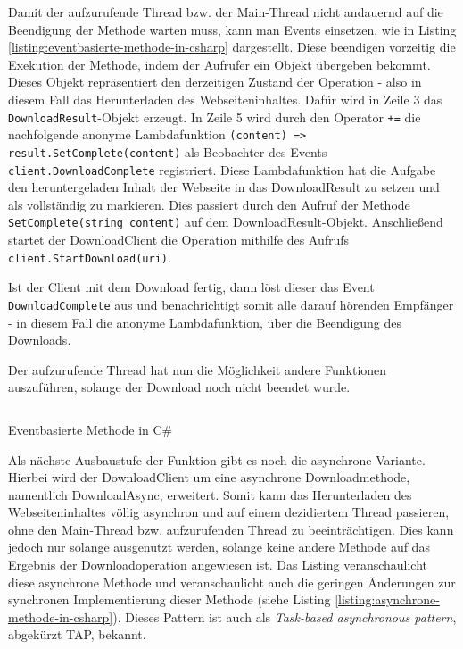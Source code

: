 Damit der aufzurufende Thread bzw. der Main-Thread nicht andauernd auf die Beendigung der Methode warten muss, kann man Events einsetzen, wie in Listing \ref{listing:eventbasierte-methode-in-csharp} dargestellt. Diese beendigen vorzeitig die Exekution der Methode, indem der Aufrufer ein Objekt übergeben bekommt. Dieses Objekt repräsentiert den derzeitigen Zustand der Operation - also in diesem Fall das Herunterladen des Webseiteninhaltes. Dafür wird in Zeile 3 das \texttt{DownloadResult}-Objekt erzeugt. In Zeile 5 wird durch den Operator \texttt{+=} die nachfolgende anonyme Lambdafunktion \texttt{(content) => result.SetComplete(content)} als Beobachter des Events \texttt{client.DownloadComplete} registriert. Diese Lambdafunktion hat die Aufgabe den heruntergeladen Inhalt der Webseite in das DownloadResult zu setzen und als vollständig zu markieren. Dies passiert durch den Aufruf der Methode \texttt{SetComplete(string content)} auf dem DownloadResult-Objekt. Anschließend startet der DownloadClient die Operation mithilfe des Aufrufs \texttt{client.StartDownload(uri)}.

Ist der Client mit dem Download fertig, dann löst dieser das Event \texttt{DownloadComplete} aus und benachrichtigt somit alle darauf hörenden Empfänger - in diesem Fall die anonyme Lambdafunktion, über die Beendigung des Downloads.

Der aufzurufende Thread hat nun die Möglichkeit andere Funktionen auszuführen, solange der Download noch nicht beendet wurde.

\begin{listing}[H]
    \inputminted[framesep=2mm, baselinestretch=1.2, fontsize=\normalsize, linenos]{csharp}{codes/example_eventbased.cs}
    \caption{Eventbasierte Methode in C\#}
    \label{listing:eventbasierte-methode-in-csharp}
\end{listing}

Als nächste Ausbaustufe der Funktion gibt es noch die asynchrone Variante. Hierbei wird der DownloadClient um eine asynchrone Downloadmethode, namentlich DownloadAsync, erweitert. Somit kann das Herunterladen des Webseiteninhaltes völlig asynchron und auf einem dezidiertem Thread passieren, ohne den Main-Thread bzw. aufzurufenden Thread zu beeinträchtigen. Dies kann jedoch nur solange ausgenutzt werden, solange keine andere Methode auf das Ergebnis der Downloadoperation angewiesen ist. Das Listing veranschaulicht diese asynchrone Methode und veranschaulicht auch die geringen Änderungen zur synchronen Implementierung dieser Methode (siehe Listing \ref{listing:asynchrone-methode-in-csharp}). Dieses Pattern ist auch als \textit{Task-based asynchronous pattern}, abgekürzt TAP, bekannt.

